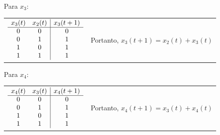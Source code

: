 \documentclass[12pt]{article}
\begin{document}
{\bigbreak
Para $x_3$:

\begin{tabular}{c l}
$\begin{array}{cc | c}
  x_3 (t) &  x_2 (t) & x_3 (t + 1) \\
  \hline
    0     &     0    &     0       \\
    0     &     1    &     1       \\
    1     &     0    &     1       \\
    1     &     1    &     1       
\end{array}$

&


Portanto, $x_3 (t + 1) = x_2 (t) + x_3 (t)$ 
\end{tabular}

\bigbreak
Para $x_4$: 

\begin{tabular}{c l}
$\begin{array}{cc | c}
  x_4 (t) &  x_3 (t) & x_4 (t + 1) \\
  \hline
    0     &     0    &     0       \\
    0     &     1    &     1       \\
    1     &     0    &     1       \\
    1     &     1    &     1       
\end{array}$

&


Portanto, $x_4 (t + 1) = x_3 (t) + x_4 (t)$ 
\end{tabular}
}
\end{document}

